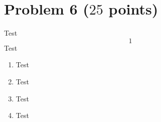 \documentclass[a4paper]{article}%
\begin{document}
\section*{Problem 6 ($25$ points)} 
Test
\begin{equation*}
  1
\end{equation*}
Test

\begin{enumerate}[label=(\alph*)]
  \item 
  Test
  \item
  Test
  \item 
  Test
  \item 
  Test
\end{enumerate}

\clearpage %

\clearpage %

\clearpage
{}\clearpage %
\end{document}
